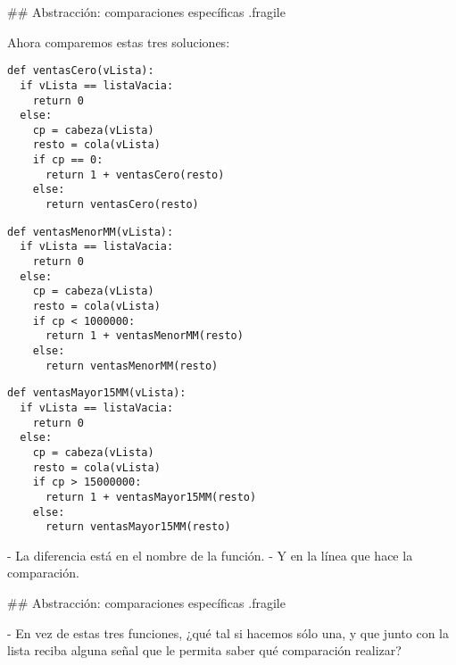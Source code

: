 ## Abstracción: comparaciones específicas {.fragile}

Ahora comparemos estas tres soluciones:

\vspace{-2ex}

\bgncolumns
{}

\begin{lstlisting}[style=frame03]
def ventasCero(vLista):
  if vLista == listaVacia:
    return 0
  else:
    cp = cabeza(vLista)
    resto = cola(vLista)
    if cp == 0:
      return 1 + ventasCero(resto)
    else:
      return ventasCero(resto)
\end{lstlisting}


\begin{lstlisting}[style=frame03]
def ventasMenorMM(vLista):
  if vLista == listaVacia:
    return 0
  else:
    cp = cabeza(vLista)
    resto = cola(vLista)
    if cp < 1000000:
      return 1 + ventasMenorMM(resto)
    else:
      return ventasMenorMM(resto)
\end{lstlisting}

\trmcolumns

\vspace{-2ex}

\bgncolumns
{}

\begin{lstlisting}[style=frame03]
def ventasMayor15MM(vLista):
  if vLista == listaVacia:
    return 0
  else:
    cp = cabeza(vLista)
    resto = cola(vLista)
    if cp > 15000000:
      return 1 + ventasMayor15MM(resto)
    else:
      return ventasMayor15MM(resto)
\end{lstlisting}


\pause

\vspace{2ex}
\bgnblockgood

- La diferencia está en el nombre de la función.
- Y en la línea que hace la comparación.

\trmblockgood

\trmcolumns

## Abstracción: comparaciones específicas {.fragile}

- En vez de estas tres funciones, ¿qué tal si hacemos sólo una, y que junto con la lista
reciba alguna señal que le permita saber qué comparación realizar?

